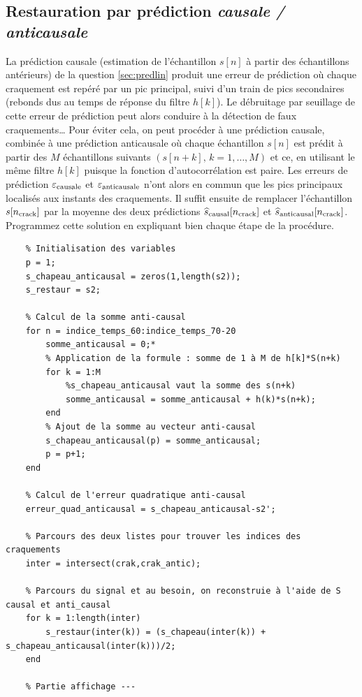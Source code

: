 \documentclass{article}
\begin{document}
\subsection{Restauration par prédiction {\em causale / anticausale}}

La prédiction causale (estimation de l'échantillon $s[n]$ à partir des échantillons antérieurs) de la question \ref{sec:predlin} produit une erreur de prédiction où chaque craquement est repéré par un pic principal, suivi d'un train de pics secondaires (rebonds dus au temps de réponse du filtre $h[k]$). Le débruitage par seuillage de cette erreur de prédiction peut alors conduire à la détection de faux craquements\ldots
Pour éviter cela, on peut procéder à une prédiction causale, combinée à une prédiction anticausale où chaque échantillon 
$s[n]$ est prédit à partir des $M$ échantillons suivants $(s[n+k],\,k=1,\ldots,M)$ et ce, en utilisant le même filtre $h[k]$ puisque la fonction d'autocorrélation est paire. Les erreurs de prédiction $\varepsilon_{\rm causale}$ et $\varepsilon_{\rm anticausale}$ n'ont alors en commun que les pics principaux localisés aux instants des craquements. Il suffit ensuite de remplacer l'échantillon $s[n_{\rm crack}]$ par la moyenne des deux prédictions $\widehat{s}_{\rm causal}[n_{\rm crack}]$ et $\widehat{s}_{\rm anticausal}[n_{\rm crack}]$. \\

Programmez cette solution en expliquant bien chaque étape de la procédure. 
\begin{verbatim}
    % Initialisation des variables 
    p = 1;
    s_chapeau_anticausal = zeros(1,length(s2));
    s_restaur = s2;
    
    % Calcul de la somme anti-causal  
    for n = indice_temps_60:indice_temps_70-20
        somme_anticausal = 0;*
        % Application de la formule : somme de 1 à M de h[k]*S(n+k)
        for k = 1:M
            %s_chapeau_anticausal vaut la somme des s(n+k)
            somme_anticausal = somme_anticausal + h(k)*s(n+k);
        end
        % Ajout de la somme au vecteur anti-causal
        s_chapeau_anticausal(p) = somme_anticausal;
        p = p+1;
    end
    
    % Calcul de l'erreur quadratique anti-causal
    erreur_quad_anticausal = s_chapeau_anticausal-s2';
    
    % Parcours des deux listes pour trouver les indices des craquements 
    inter = intersect(crak,crak_antic);
    
    % Parcours du signal et au besoin, on reconstruie à l'aide de S causal et anti_causal 
    for k = 1:length(inter)
        s_restaur(inter(k)) = (s_chapeau(inter(k)) + s_chapeau_anticausal(inter(k)))/2;
    end
    
    % Partie affichage ---
\end{verbatim}
\end{document}
